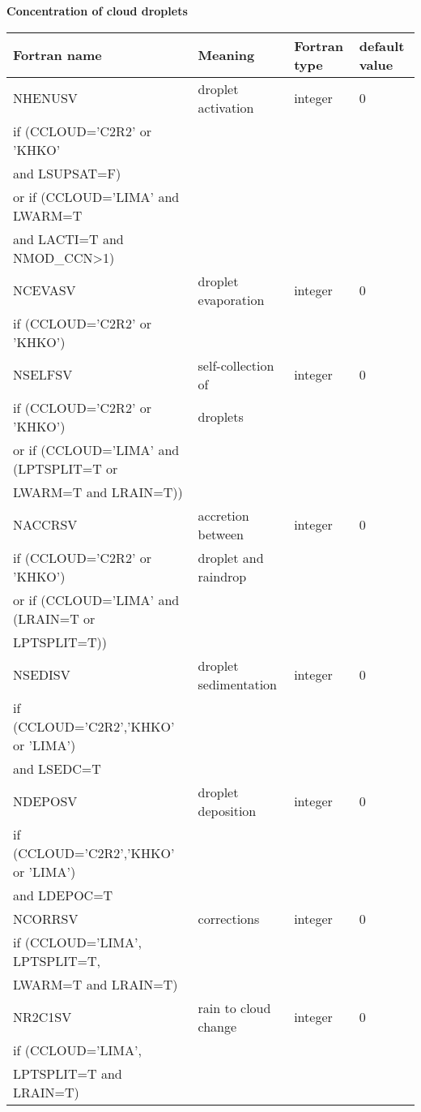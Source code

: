 \textbf{Concentration of cloud droplets}
\begin{longtable} {|p{}|p{}|>{\centering}p{}|p{}<{\centering}|}
\hline
Fortran name & Meaning & Fortran type & default value \\
\hline \hline
\endhead
NHENUSV & droplet activation & integer & 0 \\ \nopagebreak
if (CCLOUD='C2R2' or 'KHKO' &&&\\ \nopagebreak
and LSUPSAT=F)  &&&\\ \nopagebreak
or if (CCLOUD='LIMA' and LWARM=T &&&\\ \nopagebreak
and LACTI=T and NMOD\_CCN>1)&&&\\\hline
NCEVASV & droplet evaporation & integer & 0 \\ \nopagebreak
if (CCLOUD='C2R2' or 'KHKO') &&&\\\hline
NSELFSV & self-collection of  & integer & 0 \\ \nopagebreak
if (CCLOUD='C2R2' or 'KHKO') & droplets&&\\ \nopagebreak
or if (CCLOUD='LIMA' and (LPTSPLIT=T or &&&\\ \nopagebreak
LWARM=T and LRAIN=T))&&&\\\hline
NACCRSV & accretion between  & integer & 0 \\ \nopagebreak
if (CCLOUD='C2R2' or 'KHKO') &droplet and raindrop&&\\ \nopagebreak
or if (CCLOUD='LIMA' and (LRAIN=T or &&& \\ \nopagebreak
LPTSPLIT=T)) &&& \\\hline
NSEDISV & droplet sedimentation& integer & 0 \\ \nopagebreak
if (CCLOUD='C2R2','KHKO' or 'LIMA') &&&\\ \nopagebreak
and LSEDC=T &&&\\\hline
NDEPOSV & droplet deposition& integer & 0 \\ \nopagebreak
if (CCLOUD='C2R2','KHKO' or 'LIMA') &&&\\ \nopagebreak
and LDEPOC=T &&&\\\hline

NCORRSV & corrections & integer & 0 \\ \nopagebreak
if (CCLOUD='LIMA', LPTSPLIT=T, &&&\\ \nopagebreak
LWARM=T and LRAIN=T)&&& \\\hline

NR2C1SV & rain to cloud change& integer & 0 \\ \nopagebreak
if (CCLOUD='LIMA', &&&\\ \nopagebreak
LPTSPLIT=T and LRAIN=T)&&& \\\hline


\end{longtable}
